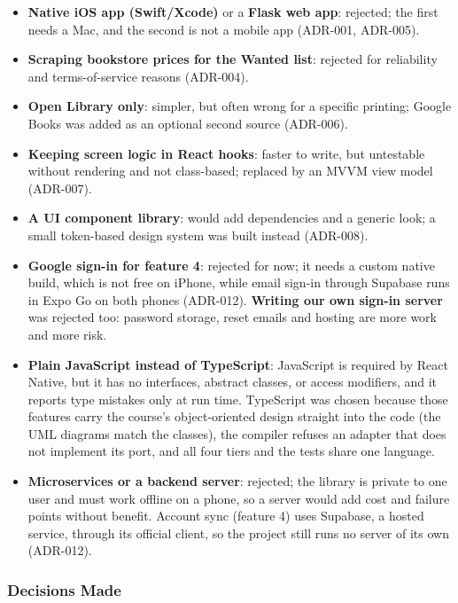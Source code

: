 \documentclass[12pt]{article}
\begin{document}
\begin{itemize}
    \item \textbf{Native iOS app (Swift/Xcode)} or a \textbf{Flask web app}: rejected; the first needs a Mac, and the second is not a mobile app (ADR-001, ADR-005).
    \item \textbf{Scraping bookstore prices for the Wanted list}: rejected for reliability and terms-of-service reasons (ADR-004).
    \item \textbf{Open Library only}: simpler, but often wrong for a specific printing; Google Books was added as an optional second source (ADR-006).
    \item \textbf{Keeping screen logic in React hooks}: faster to write, but untestable without rendering and not class-based; replaced by an MVVM view model (ADR-007).
    \item \textbf{A UI component library}: would add dependencies and a generic look; a small token-based design system was built instead (ADR-008).
    \item \textbf{Google sign-in for feature 4}: rejected for now; it needs a custom native build, which is not free on iPhone, while email sign-in through Supabase runs in Expo Go on both phones (ADR-012). \textbf{Writing our own sign-in server} was rejected too: password storage, reset emails and hosting are more work and more risk.
    \item \textbf{Plain JavaScript instead of TypeScript}: JavaScript is required by React Native, but it has no interfaces, abstract classes, or access modifiers, and it reports type mistakes only at run time. TypeScript was chosen because those features carry the course's object-oriented design straight into the code (the UML diagrams match the classes), the compiler refuses an adapter that does not implement its port, and all four tiers and the tests share one language.
    \item \textbf{Microservices or a backend server}: rejected; the library is private to one user and must work offline on a phone, so a server would add cost and failure points without benefit. Account sync (feature 4) uses Supabase, a hosted service, through its official client, so the project still runs no server of its own (ADR-012).
\end{itemize}

\subsubsection{Decisions Made}
\end{document}

